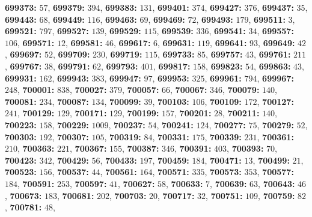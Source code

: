\textsf{\bfseries 699373:} $57$, \textsf{\bfseries 699379:} $394$, \textsf{\bfseries 699383:} $131$, \textsf{\bfseries 699401:} $374$, \textsf{\bfseries 699427:} $376$, \textsf{\bfseries 699437:} $35$, \textsf{\bfseries 699443:} $68$, \textsf{\bfseries 699449:} $116$, \textsf{\bfseries 699463:} $69$, \textsf{\bfseries 699469:} $72$, \textsf{\bfseries 699493:} $179$, \textsf{\bfseries 699511:} $3$, \textsf{\bfseries 699521:} $797$, \textsf{\bfseries 699527:} $139$, \textsf{\bfseries 699529:} $115$, \textsf{\bfseries 699539:} $336$, \textsf{\bfseries 699541:} $34$, \textsf{\bfseries 699557:} $106$, \textsf{\bfseries 699571:} $12$, \textsf{\bfseries 699581:} $46$, \textsf{\bfseries 699617:} $6$, \textsf{\bfseries 699631:} $119$, \textsf{\bfseries 699641:} $93$, \textsf{\bfseries 699649:} $42$, \textsf{\bfseries 699697:} $52$, \textsf{\bfseries 699709:} $230$, \textsf{\bfseries 699719:} $115$, \textsf{\bfseries 699733:} $85$, \textsf{\bfseries 699757:} $43$, \textsf{\bfseries 699761:} $211$, \textsf{\bfseries 699767:} $38$, \textsf{\bfseries 699791:} $62$, \textsf{\bfseries 699793:} $401$, \textsf{\bfseries 699817:} $158$, \textsf{\bfseries 699823:} $54$, \textsf{\bfseries 699863:} $43$, \textsf{\bfseries 699931:} $162$, \textsf{\bfseries 699943:} $383$, \textsf{\bfseries 699947:} $97$, \textsf{\bfseries 699953:} $325$, \textsf{\bfseries 699961:} $794$, \textsf{\bfseries 699967:} $248$, \textsf{\bfseries 700001:} $838$, \textsf{\bfseries 700027:} $379$, \textsf{\bfseries 700057:} $66$, \textsf{\bfseries 700067:} $346$, \textsf{\bfseries 700079:} $140$, \textsf{\bfseries 700081:} $234$, \textsf{\bfseries 700087:} $134$, \textsf{\bfseries 700099:} $39$, \textsf{\bfseries 700103:} $106$, \textsf{\bfseries 700109:} $172$, \textsf{\bfseries 700127:} $241$, \textsf{\bfseries 700129:} $129$, \textsf{\bfseries 700171:} $129$, \textsf{\bfseries 700199:} $157$, \textsf{\bfseries 700201:} $28$, \textsf{\bfseries 700211:} $140$, \textsf{\bfseries 700223:} $158$, \textsf{\bfseries 700229:} $1009$, \textsf{\bfseries 700237:} $54$, \textsf{\bfseries 700241:} $124$, \textsf{\bfseries 700277:} $75$, \textsf{\bfseries 700279:} $52$, \textsf{\bfseries 700303:} $192$, \textsf{\bfseries 700307:} $105$, \textsf{\bfseries 700319:} $84$, \textsf{\bfseries 700331:} $175$, \textsf{\bfseries 700339:} $231$, \textsf{\bfseries 700361:} $210$, \textsf{\bfseries 700363:} $221$, \textsf{\bfseries 700367:} $155$, \textsf{\bfseries 700387:} $346$, \textsf{\bfseries 700391:} $403$, \textsf{\bfseries 700393:} $70$, \textsf{\bfseries 700423:} $342$, \textsf{\bfseries 700429:} $56$, \textsf{\bfseries 700433:} $197$, \textsf{\bfseries 700459:} $184$, \textsf{\bfseries 700471:} $13$, \textsf{\bfseries 700499:} $21$, \textsf{\bfseries 700523:} $156$, \textsf{\bfseries 700537:} $44$, \textsf{\bfseries 700561:} $164$, \textsf{\bfseries 700571:} $335$, \textsf{\bfseries 700573:} $353$, \textsf{\bfseries 700577:} $184$, \textsf{\bfseries 700591:} $253$, \textsf{\bfseries 700597:} $41$, \textsf{\bfseries 700627:} $58$, \textsf{\bfseries 700633:} $7$, \textsf{\bfseries 700639:} $63$, \textsf{\bfseries 700643:} $46$, \textsf{\bfseries 700673:} $183$, \textsf{\bfseries 700681:} $202$, \textsf{\bfseries 700703:} $20$, \textsf{\bfseries 700717:} $32$, \textsf{\bfseries 700751:} $109$, \textsf{\bfseries 700759:} $82$, \textsf{\bfseries 700781:} $48$, 
